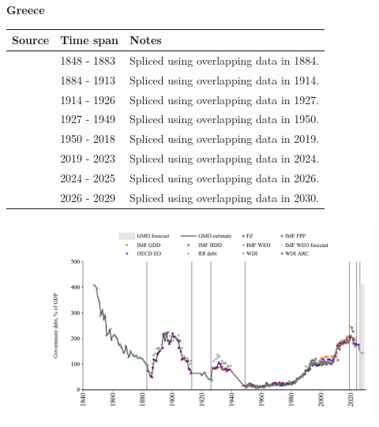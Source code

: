 \documentclass[12pt,a4paper,landscape]{article}
\begin{document}
\begin{adjustbox}{max totalsize={\paperwidth}{\paperheight},center}
\begin{minipage}[t][\textheight][t]{\textwidth}
\vspace*{0.5cm}
{}
\begin{center}
{\Large\bfseries Greece}
\end{center}
\vspace{0.5cm}
\begin{table}[H]
\centering
\small
\begin{tabular}{|l|l|l|}
\hline
\textbf{Source} & \textbf{Time span} & \textbf{Notes} \\
\hline
\rowcolor{white}\cite{RR_debt}& 1848 - 1883 &Spliced using overlapping data in 1884.\\
\rowcolor{lightgray}\cite{IMF_FPP}& 1884 - 1913 &Spliced using overlapping data in 1914.\\
\rowcolor{white}\cite{RR_debt}& 1914 - 1926 &Spliced using overlapping data in 1927.\\
\rowcolor{lightgray}\cite{IMF_FPP}& 1927 - 1949 &Spliced using overlapping data in 1950.\\
\rowcolor{white}\cite{IMF_GDD}& 1950 - 2018 &Spliced using overlapping data in 2019.\\
\rowcolor{lightgray}\cite{IMF_FPP}& 2019 - 2023 &Spliced using overlapping data in 2024.\\
\rowcolor{white}\cite{OECD_EO}& 2024 - 2025 &Spliced using overlapping data in 2026.\\
\rowcolor{lightgray}\cite{IMF_WEO_forecast}& 2026 - 2029 &Spliced using overlapping data in 2030.\\
\hline
\end{tabular}
\end{table}
\begin{figure}[H]
\centering
\includegraphics[width=\textwidth,height=0.6\textheight,keepaspectratio]{graphs/GRC_govdebt_GDP.pdf}
\end{figure}
\end{minipage}
\end{adjustbox}
\end{document}
